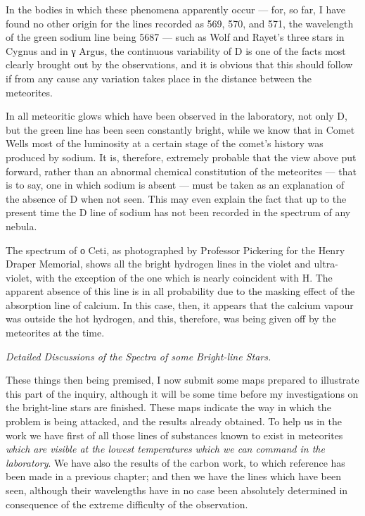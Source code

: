 \documentclass[a4paper, 12pt, oneside, polutonikogreek, english]{article}
\begin{document}
In the bodies in which these phenomena apparently occur --- for, so far, I have found no other origin for the lines recorded as 569, 570, and 571, the wavelength of the green sodium line being 5687 --- such as Wolf and Rayet's three stars in Cygnus and in γ Argus, the continuous variability of D is one of the facts most clearly brought out by the observations, and it is obvious that this should follow if from any cause any variation takes place in the distance between the meteorites.

In all meteoritic glows which have been observed in the laboratory, not only D, but the green line has been seen constantly bright, while we know that in Comet Wells most of the luminosity at a certain stage of the comet's history was produced by sodium. It is, therefore, extremely probable that the view above put forward, rather than an abnormal chemical constitution of the meteorites --- that is to say, one in which sodium is absent --- must be taken as an explanation of the absence of D when not seen. This may even explain the fact that up to the present time the D line of sodium has not been recorded in the spectrum of any nebula.

The spectrum of ο Ceti, as photographed by Professor Pickering for the Henry Draper Memorial, shows all the bright hydrogen lines in the violet and ultra-violet, with the exception of the one which is nearly coincident with H. The apparent absence of this line is in all probability due to the masking effect of the absorption line of calcium. In this case, then, it appears that the calcium vapour was outside the hot hydrogen, and this, therefore, was being given off by the meteorites at the time.

\emph{Detailed Discussions of the Spectra of some Bright-line Stars.}

These things then being premised, I now submit some maps prepared to illustrate this part of the inquiry, although it will be some time before my investigations on the bright-line stars are finished. These maps indicate the way in which the problem is being attacked, and the results already obtained. To help us in the work we have first of all those lines of substances known to exist in meteorites \emph{which are visible at the lowest temperatures which we can command in the laboratory}. We have also the results of the carbon work, to which reference has been made in a previous chapter; and then we have the lines which have been seen, although their wavelengths have in no case been absolutely determined in consequence of the extreme difficulty of the observation.
\end{document}
